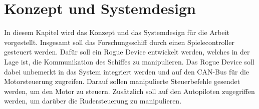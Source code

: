 \chapter{Konzept und Systemdesign}

In diesem Kapitel wird das Konzept und das Systemdesign für die Arbeit vorgestellt. Insgesamt soll das Forschungsschiff durch einen Spielecontroller
gesteuert werden. Dafür soll ein Rogue Device entwickelt werden, welches in der Lage ist, die Kommunikation des Schiffes zu manipulieren. 
Das Rogue Device soll dabei unbemerkt in das System integriert werden und auf den CAN-Bus für die Motorsteuerung zugreifen. Darauf sollen
manipulierte Steuerbefehle gesendet werden, um den Motor zu steuern. Zusätzlich soll auf den Autopiloten zugegriffen werden, um darüber die Rudersteuerung
zu manipulieren. \\

